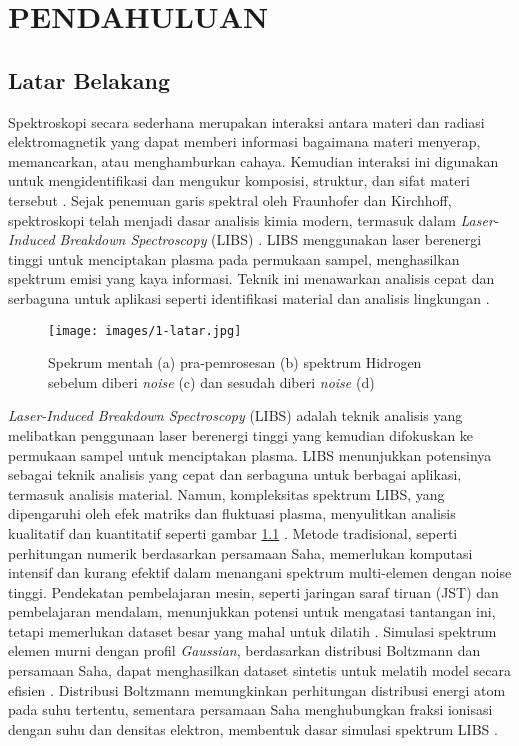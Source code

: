 




\chapter{PENDAHULUAN}



\section{Latar Belakang}


\par  Spektroskopi secara sederhana merupakan  interaksi antara materi dan radiasi elektromagnetik yang dapat memberi informasi bagaimana materi menyerap, memancarkan, atau menghamburkan cahaya. Kemudian interaksi ini  digunakan untuk mengidentifikasi dan mengukur komposisi, struktur, dan sifat materi tersebut \parencite{hollas2013}.  
Sejak penemuan garis spektral oleh Fraunhofer dan Kirchhoff, spektroskopi telah menjadi dasar analisis kimia modern, termasuk dalam \textit{Laser-Induced Breakdown Spectroscopy} (LIBS) \parencite{thorne1999}. LIBS menggunakan laser berenergi tinggi untuk menciptakan plasma pada permukaan sampel, menghasilkan spektrum emisi yang kaya informasi. Teknik ini menawarkan analisis cepat dan serbaguna untuk aplikasi seperti identifikasi material dan analisis lingkungan \parencite{thorne1999}.
\begin{figure}
    \centering
    \texttt{[image: images/1-latar.jpg]}
    \caption{Spekrum mentah (a) pra-pemrosesan (b) spektrum Hidrogen sebelum diberi \textit{noise} (c) dan sesudah diberi \textit{noise} (d) \citep{Gasior2023}}
    \label{fig:kenapa}
\end{figure}

\par \textit{Laser-Induced Breakdown Spectroscopy} (LIBS) adalah teknik analisis yang melibatkan penggunaan laser berenergi tinggi yang kemudian difokuskan ke permukaan sampel untuk menciptakan plasma. LIBS menunjukkan potensinya sebagai teknik analisis yang cepat dan serbaguna untuk berbagai aplikasi, termasuk analisis material. Namun, kompleksitas spektrum LIBS, yang dipengaruhi oleh efek matriks dan fluktuasi plasma, menyulitkan analisis kualitatif dan kuantitatif seperti gambar \ref{fig:kenapa} \parencite{gasior2023analysis}. Metode tradisional, seperti perhitungan numerik berdasarkan persamaan Saha, memerlukan komputasi intensif dan kurang efektif dalam menangani spektrum multi-elemen dengan noise tinggi. Pendekatan pembelajaran mesin, seperti jaringan saraf tiruan (JST) dan pembelajaran mendalam, menunjukkan potensi untuk mengatasi tantangan ini, tetapi memerlukan dataset besar yang mahal untuk dilatih \parencite{gasior2023analysis}. Simulasi spektrum elemen murni dengan profil \textit{Gaussian}, berdasarkan distribusi Boltzmann dan persamaan Saha, dapat menghasilkan dataset sintetis untuk melatih model secara efisien \parencite{pan-2024}. Distribusi Boltzmann memungkinkan perhitungan distribusi energi atom pada suhu tertentu, sementara persamaan Saha menghubungkan fraksi ionisasi dengan suhu dan densitas elektron, membentuk dasar simulasi spektrum LIBS \parencite{thorne1999}.

